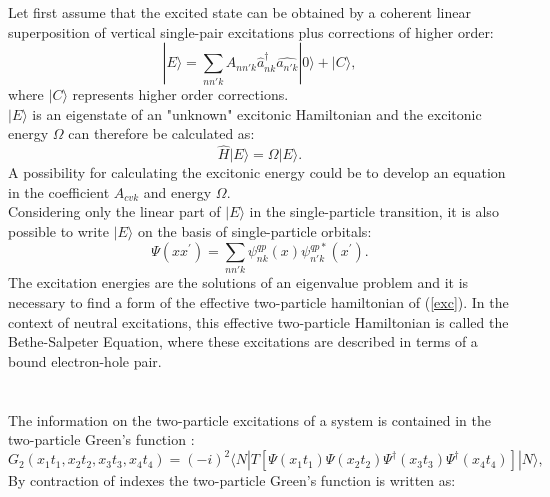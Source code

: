 \documentclass[11pt]{article}
\begin{document}
Let first assume that the excited
state can be obtained by a coherent linear superposition of
vertical single-pair excitations plus corrections of higher order:
\begin{equation} 
| E \rangle =
\sum_{nn'k}A_{nn'k}{\hat{a}}^{\dagger}_{nk}\hat{a_{n'k}}|
0\rangle + | C \rangle, 
\end{equation}
where $| C \rangle$ represents higher order corrections.\\
$| E \rangle$ is an eigenstate of an "unknown" excitonic Hamiltonian
and the excitonic energy $\Omega$ can therefore be calculated as:
\begin{equation}\label{exc} 
\hat{H} | E \rangle = \Omega | E \rangle.
\end{equation} 
A possibility for calculating the excitonic energy could be to develop an equation in the coefficient $A_{cvk}$ and energy $\Omega$.\\

Considering only the linear part of $|E\rangle$ in the single-particle transition, it is also
possible to write $|E\rangle$ on the basis of single-particle orbitals:
\begin{equation}
\Psi(xx^{\prime}) = \sum_{nn'k}\psi^{qp}_{nk}(x)\psi^{qp*}_{n'k}(x^{\prime}).
\end{equation}
The excitation energies are the solutions of an eigenvalue problem and it is necessary
to find a form of the effective two-particle hamiltonian of (\ref{exc}). 
In the context of neutral excitations, this effective two-particle Hamiltonian
is called the Bethe-Salpeter Equation, where these excitations are described in terms of a bound electron-hole pair.\\
\\
\\
The information on the two-particle excitations of a system is contained in the
two-particle Green's function \cite{fett-wale71book}:
\begin{equation}
G_{2}(x_{1}t_{1},x_{2}t_{2},x_{3}t_{3},x_{4}t_{4}) = (-i)^{2} \langle N | T \left[ \Psi(x_{1}t_{1}) \Psi(x_{2}t_{2})\Psi^\dagger(x_{3}t_{3})\Psi^\dagger(x_{4}t_{4})\right] | N \rangle,
\end{equation}
By contraction of  indexes the two-particle Green's function is
written as:
\end{document}
